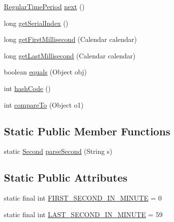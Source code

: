 \begin{DoxyCompactItemize}
\item 
\mbox{\hyperlink{classorg_1_1jfree_1_1data_1_1time_1_1_regular_time_period}{Regular\+Time\+Period}} \mbox{\hyperlink{classorg_1_1jfree_1_1data_1_1time_1_1_second_ade3e235ac314c3c9ced69119bf3da2f1}{next}} ()
\item 
long \mbox{\hyperlink{classorg_1_1jfree_1_1data_1_1time_1_1_second_a3e84e608f1a6a45ca2137ef54f29da38}{get\+Serial\+Index}} ()
\item 
long \mbox{\hyperlink{classorg_1_1jfree_1_1data_1_1time_1_1_second_a033a094744db4b5b941bd1a5c47f2b38}{get\+First\+Millisecond}} (Calendar calendar)
\item 
long \mbox{\hyperlink{classorg_1_1jfree_1_1data_1_1time_1_1_second_a3ed4f173b2cf2a20c06ac0cc21092488}{get\+Last\+Millisecond}} (Calendar calendar)
\item 
boolean \mbox{\hyperlink{classorg_1_1jfree_1_1data_1_1time_1_1_second_ad1879c287aa958bf7bff3d387b76cf10}{equals}} (Object obj)
\item 
int \mbox{\hyperlink{classorg_1_1jfree_1_1data_1_1time_1_1_second_a4d21b0d91740b6a494285ec81f856b1f}{hash\+Code}} ()
\item 
int \mbox{\hyperlink{classorg_1_1jfree_1_1data_1_1time_1_1_second_a4db9eb74d6d9de2fe60626384a8a7afc}{compare\+To}} (Object o1)
\end{DoxyCompactItemize}
\subsection*{Static Public Member Functions}
\begin{DoxyCompactItemize}
\item 
static \mbox{\hyperlink{classorg_1_1jfree_1_1data_1_1time_1_1_second}{Second}} \mbox{\hyperlink{classorg_1_1jfree_1_1data_1_1time_1_1_second_af670b6c42df856b28d97b1f49d74a999}{parse\+Second}} (String s)
\end{DoxyCompactItemize}
\subsection*{Static Public Attributes}
\begin{DoxyCompactItemize}
\item 
static final int \mbox{\hyperlink{classorg_1_1jfree_1_1data_1_1time_1_1_second_a328bb79506673088dabca1da12632cf8}{F\+I\+R\+S\+T\+\_\+\+S\+E\+C\+O\+N\+D\+\_\+\+I\+N\+\_\+\+M\+I\+N\+U\+TE}} = 0
\item 
static final int \mbox{\hyperlink{classorg_1_1jfree_1_1data_1_1time_1_1_second_aa8799eafb66b775faf92711aa1e5d93c}{L\+A\+S\+T\+\_\+\+S\+E\+C\+O\+N\+D\+\_\+\+I\+N\+\_\+\+M\+I\+N\+U\+TE}} = 59
\end{DoxyCompactItemize}


